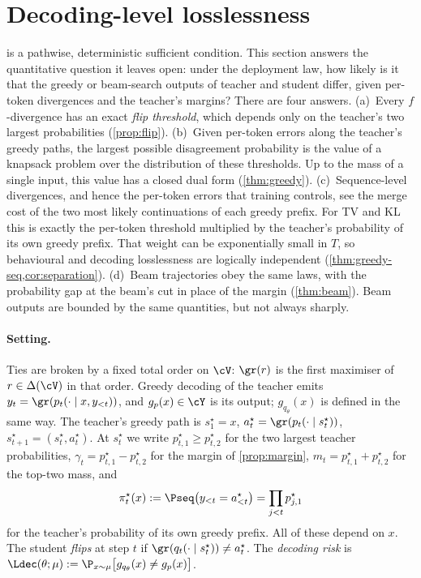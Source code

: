 \section{Decoding-level losslessness}\label{sec:decoding}

 is a pathwise, deterministic sufficient condition. This section answers the
quantitative question it leaves open: under the deployment law, how likely is it that the greedy or
beam-search outputs of teacher and student differ, given per-token divergences and the teacher's
margins? There are four answers.
(a)~Every $f$-divergence has an exact \emph{flip threshold}, which depends only on the teacher's two
largest probabilities (\cref{prop:flip}).
(b)~Given per-token errors along the teacher's greedy paths, the largest possible disagreement
probability is the value of a knapsack problem over the distribution of these thresholds. Up to the mass
of a single input, this value has a closed dual form (\cref{thm:greedy}).
(c)~Sequence-level divergences, and hence the per-token errors that training controls, see the merge cost
of the two most likely continuations of each greedy prefix. For TV and KL this is exactly the per-token
threshold multiplied by the teacher's probability of its own greedy prefix. That weight can be
exponentially small in $T$, so behavioural and decoding losslessness are logically independent
(\cref{thm:greedy-seq,cor:separation}).
(d)~Beam trajectories obey the same laws, with the probability gap at the beam's cut in place of the
margin (\cref{thm:beam}). Beam outputs are bounded by the same quantities, but not always sharply.

\paragraph{Setting.}
Ties are broken by a fixed total order on $\cV$: $\gr(r)$ is the first maximiser of $r\in\Delta(\cV)$ in that
order. Greedy decoding of the teacher emits $y_t=\gr(p_t(\cdot\mid x,y_{<t}))$, and $g_p(x)\in\cY$ is its
output; $g_{q_\theta}(x)$ is defined in the same way. The teacher's greedy path is $s^\star_1=x$,
$a^\star_t=\gr(p_t(\cdot\mid s^\star_t))$, $s^\star_{t+1}=(s^\star_t,a^\star_t)$. At $s^\star_t$ we write
$p^\star_{t,1}\ge p^\star_{t,2}$ for the two largest teacher probabilities, $\gamma_t=p^\star_{t,1}-p^\star_{t,2}$ for the margin
of \cref{prop:margin}, $m_t=p^\star_{t,1}+p^\star_{t,2}$ for the top-two mass, and
\[
\pi^\star_t(x):=\Pseq\big(y_{<t}=a^\star_{<t}\big)=\prod_{j<t}p^\star_{j,1}
\]
for the teacher's probability of its own greedy prefix. All of these depend on $x$. The student
\emph{flips} at step $t$ if $\gr(q_t(\cdot\mid s^\star_t))\neq a^\star_t$. The \emph{decoding risk} is
$\Ldec(\theta;\mu):=\P_{x\sim\mu}\big[g_{q_\theta}(x)\neq g_p(x)\big]$.

